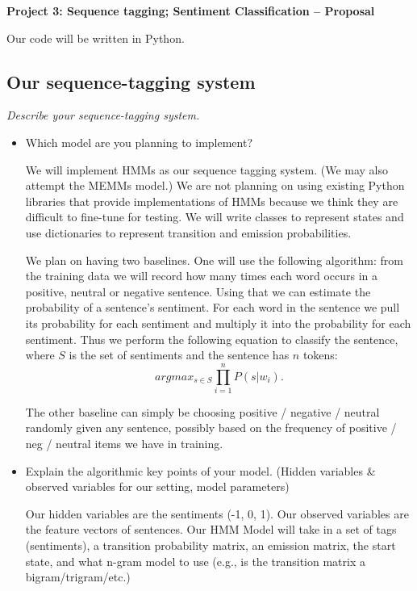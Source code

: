 \documentclass{article}
\begin{document}
\begin{center}\textbf{Project 3: Sequence tagging; Sentiment Classification -- Proposal}\end{center}

Our code will be written in Python.

\subsection*{Our sequence-tagging system}

\textit{Describe your sequence-tagging system.}\par

\begin{itemize}
\item Which model are you planning to implement?\par

We will implement HMMs as our sequence tagging system. (We may also attempt the MEMMs model.) We are not planning on using existing Python libraries that provide implementations of HMMs because we think they are difficult to fine-tune for testing. We will write classes to represent states and use dictionaries to represent transition and emission probabilities.

We plan on having two baselines. One will use the following algorithm: from the training data we will record how many times each word occurs in a positive, neutral or negative sentence. Using that we can estimate the probability of a sentence's sentiment. For each word in the sentence we pull its probability for each sentiment and multiply it into the probability for each sentiment. Thus we perform the following equation to classify the sentence, where $S$ is the set of sentiments and the sentence has $n$ tokens:
\[argmax_{s \in S}{\prod_{i=1}^n} P(s|w_i).\]

The other baseline can simply be choosing positive / negative / neutral randomly given any sentence, possibly based on the frequency of positive / neg / neutral items we have in training.

\item Explain the algorithmic key points of your model. (Hidden variables \& observed variables for our setting, model parameters)\par

Our hidden variables are the sentiments (-1, 0, 1). Our observed variables are the feature vectors of sentences. Our HMM Model will take in a set of tags (sentiments), a transition probability matrix, an emission matrix, the start state, and what n-gram model to use (e.g., is the transition matrix a bigram/trigram/etc.)


\end{itemize}
\end{document}

